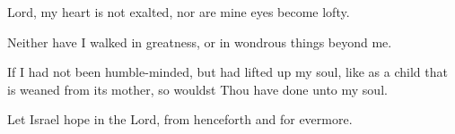 Lord, my heart is not exalted, nor are mine eyes become lofty.

Neither have I walked in greatness, or in wondrous things beyond me.

If I had not been humble-minded, but had lifted up my soul, like as a child that is weaned from its mother, so wouldst Thou have done unto my soul.

Let Israel hope in the Lord, from henceforth and for evermore.

